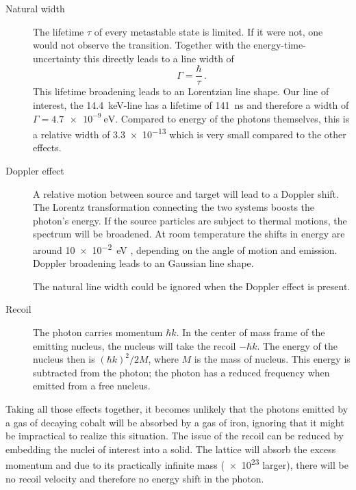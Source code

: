 \documentclass[11pt, english, fleqn, DIV=15, headinclude, BCOR=2cm]{scrreprt}
\begin{document}
\begin{description}
    \item[Natural width]
        The lifetime $\tau$ of every metastable state is limited. If it were
        not, one would not observe the transition. Together with the
        energy-time-uncertainty this directly leads to a line width of
        \[
            \Gamma = \frac\hbar\tau \,.
        \]
        This lifetime broadening leads to an Lorentzian line shape.
        Our line of interest, the \SI{14.4}{\kilo\electronvolt}-line has a
        lifetime of \SI{141}{\nano\second} and therefore a width of $\Gamma =
        \SI{4.7e-9}{\electronvolt}$. Compared to energy of the photons
        themselves, this is a relative width of \num{3.3e-13} which is very
        small compared to the other effects.
        \parencite[42]{Schatz/Nukleare_Festkoerperphysik}

    \item[Doppler effect]
        A relative motion between source and target will lead to a Doppler
        shift. The Lorentz transformation connecting the two systems boosts the
        photon's energy. If the source particles are subject to thermal
        motions, the spectrum will be broadened. At room temperature the shifts
        in energy are around \SI{10e-2}{\electronvolt}
        \parencite[43]{Schatz/Nukleare_Festkoerperphysik}, depending on the
        angle of motion and emission. Doppler broadening leads to an Gaussian
        line shape.

        The natural line width could be ignored when the Doppler effect is
        present.

    \item[Recoil]
        The photon carries momentum $\hbar k$. In the center of mass frame of
        the emitting nucleus, the nucleus will take the recoil $- \hbar k$. The
        energy of the nucleus then is $(\hbar k)^2/2 M$, where $M$ is the mass
        of nucleus. This energy is subtracted from the photon; the photon has a
        reduced frequency when emitted from a free nucleus.
\end{description}

Taking all those effects together, it becomes unlikely that the photons emitted
by a gas of decaying cobalt will be absorbed by a gas of iron, ignoring that it
might be impractical to realize this situation. The issue of the recoil can be
reduced by embedding the nuclei of interest into a solid. The lattice will
absorb the excess momentum and due to its practically infinite mass (\num{e23}
larger), there will be no recoil velocity and therefore no energy shift in the
photon.
\end{document}
